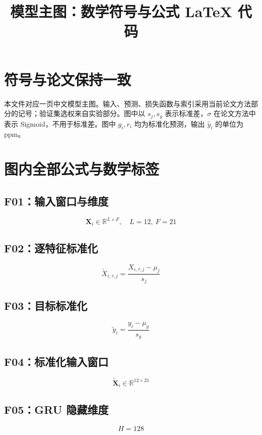 \documentclass[UTF8,a4paper,11pt]{ctexart}
\title{模型主图：数学符号与公式 LaTeX 代码}
\author{}\date{}
\begin{document}
\maketitle
\section{符号与论文保持一致}
本文件对应一页中文模型主图。输入、预测、损失函数与索引采用当前论文方法部分的记号；验证集选权来自实验部分。图中以 $s_j,s_y$ 表示标准差，$\sigma$ 在论文方法中表示 Sigmoid，不用于标准差。图中 $g_i,r_i$ 均为标准化预测，输出 $\widehat y_i$ 的单位为 ppm。
\section{图内全部公式与数学标签}
\subsection*{F01：输入窗口与维度}
\[
\mathbf{X}_i\in\mathbb{R}^{L\times F},\quad L=12,\ F=21
\]

\subsection*{F02：逐特征标准化}
\[
\widetilde{X}_{i,\tau,j}=\frac{X_{i,\tau,j}-\mu_j}{s_j}
\]

\subsection*{F03：目标标准化}
\[
\widetilde{y}_i=\frac{y_i-\mu_y}{s_y}
\]

\subsection*{F04：标准化输入窗口}
\[
\widetilde{\mathbf{X}}_i\in\mathbb{R}^{12\times21}
\]

\subsection*{F05：GRU 隐藏维度}
\[
H=128
\]

\end{document}
